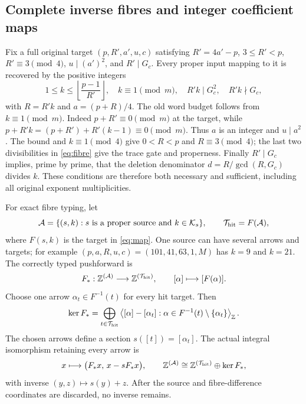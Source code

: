 \subsection{Complete inverse fibres and integer coefficient maps}
Fix a full original target $(p,R',a',u,c)$ satisfying
$R'=4a'-p$, $3\le R'<p$, $R'\equiv3\pmod4$, $u\mid(a')^2$, and
$R'\mid G_c$.  Every proper input mapping to it is recovered by the positive
integers
\begin{equation}\label{eq:fibre}
 1\le k\le\left\lfloor\frac{p-1}{R'}\right\rfloor,
 \quad k\equiv1\pmod m,\quad R'k\mid G_c^2,
 \quad R'k\nmid G_c,
\end{equation}
with $R=R'k$ and $a=(p+R)/4$. The old word budget follows from $k\equiv1\pmod m$.
Indeed $p+R'\equiv0\pmod m$ at the target, while
$p+R'k=(p+R')+R'(k-1)\equiv0\pmod m$.  Thus $a$ is an integer and
$u\mid a^2$.  The bound and $k\equiv1\pmod4$ give $0<R<p$ and
$R\equiv3\pmod4$; the last two divisibilities in \eqref{eq:fibre} give the
trace gate and properness.  Finally $R'\mid G_c$ implies, prime by prime, that
the deletion denominator $d=R/\gcd(R,G_c)$ divides $k$.  These conditions are
therefore both necessary and sufficient, including all original exponent
multiplicities.

For exact fibre typing, let
\[
 \mathcal A=\{(s,k):s\text{ is a proper source and }k\in\mathcal K_s\},
 \qquad \mathcal T_{\rm hit}=F(\mathcal A),
\]
where $F(s,k)$ is the target in \eqref{eq:map}.  One source can have several
arrows and targets; for example $(p,a,R,u,c)=(101,41,63,1,M)$ has
$k=9$ and $k=21$.  The correctly typed pushforward is
\[
 F_*:\mathbb Z^{(\mathcal A)}\longrightarrow
 \mathbb Z^{(\mathcal T_{\rm hit})},\qquad [\alpha]\longmapsto[F(\alpha)].
\]
Choose one arrow $\alpha_t\in F^{-1}(t)$ for every hit target.  Then
\[
 \ker F_*=\bigoplus_{t\in\mathcal T_{\rm hit}}
 \left\langle[\alpha]-[\alpha_t]:
 \alpha\in F^{-1}(t)\setminus\{\alpha_t\}\right\rangle_{\mathbb Z}.
\]
The chosen arrows define a section $s([t])=[\alpha_t]$.  The actual integral
isomorphism retaining every arrow is
\[
 x\longmapsto\bigl(F_*x,\,x-sF_*x\bigr),\qquad
 \mathbb Z^{(\mathcal A)}\cong
 \mathbb Z^{(\mathcal T_{\rm hit})}\oplus\ker F_*,
\]
with inverse $(y,z)\mapsto s(y)+z$.  After the source and fibre-difference
coordinates are discarded, no inverse remains.


